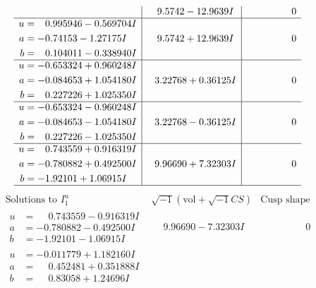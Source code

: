 \documentclass[1p]{elsarticle_modified}
\theoremstyle{definition}
\newcommand{\I}{\sqrt{-1}}
\begin{document}
$$\begin{array}{c|c|c}
 & \phantom{-}9.5742 - 12.9639 I & \phantom{-0.000000 } 0 \\ \hline\begin{aligned}
u &= \phantom{-}0.995946 - 0.569704 I \\
a &= -0.74153 - 1.27175 I \\
b &= \phantom{-}0.104011 - 0.338940 I\end{aligned}
 & \phantom{-}9.5742 + 12.9639 I & \phantom{-0.000000 } 0 \\ \hline\begin{aligned}
u &= -0.653324 + 0.960248 I \\
a &= -0.084653 + 1.054180 I \\
b &= \phantom{-}0.227226 + 1.025350 I\end{aligned}
 & \phantom{-}3.22768 + 0.36125 I & \phantom{-0.000000 } 0 \\ \hline\begin{aligned}
u &= -0.653324 - 0.960248 I \\
a &= -0.084653 - 1.054180 I \\
b &= \phantom{-}0.227226 - 1.025350 I\end{aligned}
 & \phantom{-}3.22768 - 0.36125 I & \phantom{-0.000000 } 0 \\ \hline\begin{aligned}
u &= \phantom{-}0.743559 + 0.916319 I \\
a &= -0.780882 + 0.492500 I \\
b &= -1.92101 + 1.06915 I\end{aligned}
 & \phantom{-}9.96690 + 7.32303 I & \phantom{-0.000000 } 0\\
 \hline 
 \end{array}$$\newpage$$\begin{array}{c|c|c}  
\text{Solutions to }I^u_{1}& \I (\text{vol} + \sqrt{-1}CS) & \text{Cusp shape}\\
 \hline 
\begin{aligned}
u &= \phantom{-}0.743559 - 0.916319 I \\
a &= -0.780882 - 0.492500 I \\
b &= -1.92101 - 1.06915 I\end{aligned}
 & \phantom{-}9.96690 - 7.32303 I & \phantom{-0.000000 } 0 \\ \hline\begin{aligned}
u &= -0.011779 + 1.182160 I \\
a &= \phantom{-}0.452481 + 0.351888 I \\
b &= \phantom{-}0.83058 + 1.24696 I\end{aligned}

\end{array}$$
\end{document}
